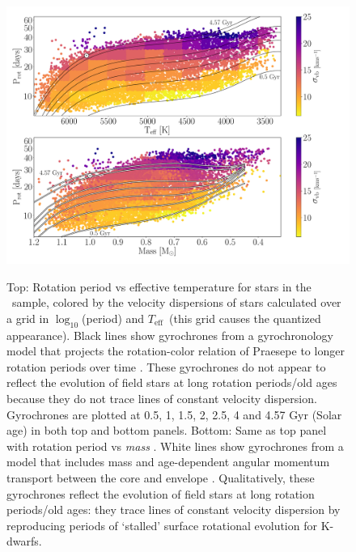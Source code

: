 \documentclass{aastex63}
\newcommand{\teff}{$T_{\mathrm{eff}}$}
\newcommand{\mct}{\citet{mcquillan2014}}
\begin{document}
\begin{figure}
  \caption{
    Top: Rotation period vs effective temperature for stars in the \mct\
    sample, colored by the velocity dispersions of stars calculated over a
    grid in $\log_{10}$(period) and \teff\ (this grid causes the quantized
    appearance).
    Black lines show gyrochrones from a gyrochronology model that projects the
    rotation-color relation of
    Praesepe to longer rotation periods over time \citep{angus2019}.
    These gyrochrones do not appear to reflect the evolution of field stars at
    long rotation periods/old ages because they do not trace lines of constant
    velocity dispersion.
    Gyrochrones are plotted at 0.5, 1, 1.5, 2, 2.5, 4 and 4.57 Gyr (Solar age)
    in both top and bottom panels.
    Bottom: Same as top panel with rotation period vs {\it mass}
    \citep[from][]{berger2020}.
    White lines show gyrochrones from a model that includes mass and
    age-dependent angular momentum transport between the core and envelope
    \citep{spada2019}.
    Qualitatively, these gyrochrones reflect the evolution of field
    stars at long rotation periods/old ages: they trace lines of constant
    velocity dispersion by reproducing periods of `stalled' surface rotational
    evolution for K-dwarfs.
}
  \centering
    \includegraphics[width=1\textwidth]{main_figure}
\label{fig:vplot}
\end{figure}
\end{document}
